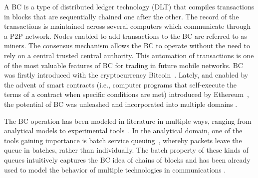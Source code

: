 \documentclass[conference]{IEEEtran}
\theoremstyle{definition}
\begin{document}
A BC is a type of distributed ledger technology (DLT) that compiles transactions in blocks that are sequentially chained one after the other. The record of the transactions is maintained across several computers which communicate through a P2P network. Nodes enabled to add transactions to the BC are referred to as miners. The consensus mechanism allows the BC to operate without the need to rely on a central trusted central authority. This automation of transactions is one of the most valuable features of BC for trading in future mobile networks.
BC was firstly introduced with the cryptocurrency Bitcoin~\cite{nakamoto2019bitcoin}. Lately, and enabled by the advent of smart contracts (i.e., computer programs that self-execute the terms of a contract when specific conditions are met) introduced by Ethereum~\cite{buterin2013ethereum}, the potential of BC was unleashed and incorporated into multiple domains \cite{cai2018decentralized}. %

The BC operation has been modeled in literature in multiple ways, ranging from analytical models to experimental tools~\cite{fan2020performance}. In the analytical domain, one of the tools gaining importance is batch service queuing~\cite{bar2007applications,chaudhry2012simple}, whereby packets leave the queue in batches, rather than individually. The batch property of these kinds of queues intuitively captures the BC idea of chains of blocks and has been already used to model the behavior of multiple technologies in communications \cite{bellalta2013performance}\cite{wen2016ruletris}\cite{kar2020throughput}.
\end{document}
